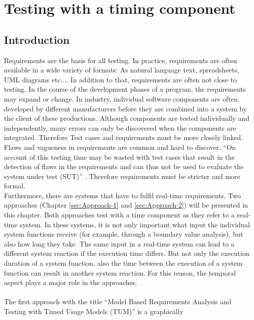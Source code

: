\chapter{Testing with a timing component}\label{sec:topic_4}


\section{Introduction}

Requirements are the basis for all testing. In practice, requirements
are often available in a wide variety of formats: As natural language
text, spreadsheets, UML diagrams etc.... In addition to that, requirements
are often not close to testing. In the course of the development phases
of a program, the requirements may expand or change. In industry,
individual software components are often developed by different manufacturers
before they are combined into a system by the client of these productions.
Although components are tested individually and independently, many
errors can only be discovered when the components are integrated.
Therefore Test cases and requirements must be more closely linked.
Flaws and vagueness in requirements are common and hard to discover.
\enquote{On account of this testing time may be wasted with test
cases that result in the detection of flaws in the requirements and
can thus not be used to evaluate the system under test (SUT)}
\cite{Siegl2010}. Therefore requirements must be stricter and more
formal.\\
 Furthermore, there are systems that have to fulfil real-time requirements.
Two approaches (Chapter \autoref{sec:Approach-1} and \autoref{sec:Approach-2})
will be presented in this chapter. Both approaches test with a time
component as they refer to a real-time system. In these systems, it
is not only important what input the individual system functions receive
(for example, through a boundary value analysis), but also how long
they take. The same input in a real-time system can lead to a different
system reaction if the execution time differs. But not only the execution
duration of a system function, also the time between the execution
of a system function can result in another system reaction. For this
reason, the temporal aspect plays a major role in the approaches.\\
 \\
The first approach with the title \enquote{Model Based Requirements
Analysis and Testing with Timed Usage Models (TUM)} is a graphically
